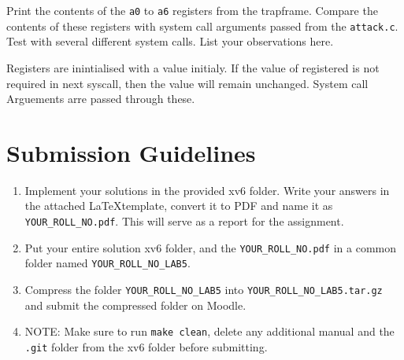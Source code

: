 \documentclass[11pt]{exam}
\begin{document}
\begin{questions}
\begin{solution}
\end{solution}

\question[5] Print the contents of the {\tt a0} to {\tt a6} registers from the trapframe. Compare the contents of these registers with system call arguments passed from the {\tt attack.c}. Test with several different system calls. 
List your observations here.
\begin{solution}

Registers are inintialised with a value initialy. If the value of registered is not required in next syscall, then the value will remain unchanged. System call Arguements arre passed through these.

\end{solution}
\end{questions}

\section*{Submission Guidelines}  
\begin{enumerate}
    \item Implement your solutions in the provided xv6 folder. Write your answers in the attached \LaTeX template, convert it to PDF and name it as \texttt{YOUR\_ROLL\_NO.pdf}. This will serve as a report for the assignment.
    \item Put your entire solution xv6 folder, and the \texttt{YOUR\_ROLL\_NO.pdf} in a common folder named \texttt{YOUR\_ROLL\_NO\_LAB5}. 
    \item Compress the folder \texttt{YOUR\_ROLL\_NO\_LAB5} into \texttt{YOUR\_ROLL\_NO\_LAB5.tar.gz} and submit the compressed folder on Moodle.
    \item NOTE: Make sure to run \texttt{make clean}, delete any additional manual and the \texttt{.git} folder from the xv6 folder before submitting.
\end{enumerate}
\end{document}
